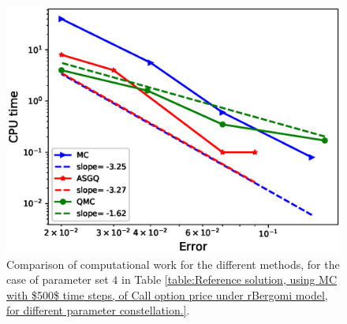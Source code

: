 \FloatBarrier
	\begin{figure}[h!]
	\centering
	\includegraphics[width=0.5\linewidth]{./figures/rBergomi_Complexity_rates/set7/error_vs_time_set7_full_comparison}
	
	\caption{Comparison of computational work for the different methods, for the case of parameter set $4$ in Table \ref{table:Reference solution, using MC with $500$ time steps, of Call option price under rBergomi model, for different parameter constellation.}.}
	\label{fig:Complexity plot for MC and MISC for Case set $5$ parameters}
\end{figure}
\FloatBarrier






